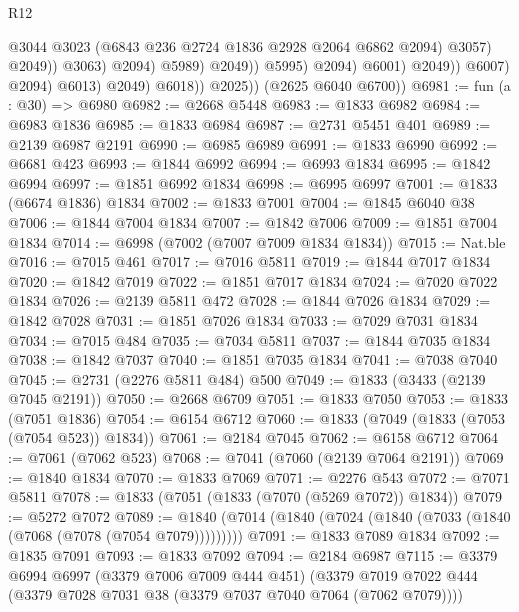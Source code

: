 \begin{lexlean}{R12}
\begin{coremodule}
                                                @3044
                                                @3023
                                                (@6843 @236 @2724 @1836 @2928 @2064 @6862 @2094)
                                                @3057)
                                              @2049))
                                          @3063)
                                        @2094)
                                      @5989)
                                    @2049))
                                @5995)
                              @2094)
                            @6001)
                          @2049))
                      @6007)
                    @2094)
                  @6013)
                @2049)
              @6018))
          @2025))
      (@2625 @6040 @6700))
@6981 := fun (a : @30) => @6980
@6982 := @2668 @5448
@6983 := @1833 @6982
@6984 := @6983 @1836
@6985 := @1833 @6984
@6987 := @2731 @5451 @401
@6989 := @2139 @6987 @2191
@6990 := @6985 @6989
@6991 := @1833 @6990
@6992 := @6681 @423
@6993 := @1844 @6992
@6994 := @6993 @1834
@6995 := @1842 @6994
@6997 := @1851 @6992 @1834
@6998 := @6995 @6997
@7001 := @1833 (@6674 @1836) @1834
@7002 := @1833 @7001
@7004 := @1845 @6040 @38
@7006 := @1844 @7004 @1834
@7007 := @1842 @7006
@7009 := @1851 @7004 @1834
@7014 := @6998 (@7002 (@7007 @7009 @1834 @1834))
@7015 := Nat.ble
@7016 := @7015 @461
@7017 := @7016 @5811
@7019 := @1844 @7017 @1834
@7020 := @1842 @7019
@7022 := @1851 @7017 @1834
@7024 := @7020 @7022 @1834
@7026 := @2139 @5811 @472
@7028 := @1844 @7026 @1834
@7029 := @1842 @7028
@7031 := @1851 @7026 @1834
@7033 := @7029 @7031 @1834
@7034 := @7015 @484
@7035 := @7034 @5811
@7037 := @1844 @7035 @1834
@7038 := @1842 @7037
@7040 := @1851 @7035 @1834
@7041 := @7038 @7040
@7045 := @2731 (@2276 @5811 @484) @500
@7049 := @1833 (@3433 (@2139 @7045 @2191))
@7050 := @2668 @6709
@7051 := @1833 @7050
@7053 := @1833 (@7051 @1836)
@7054 := @6154 @6712
@7060 := @1833 (@7049 (@1833 (@7053 (@7054 @523)) @1834))
@7061 := @2184 @7045
@7062 := @6158 @6712
@7064 := @7061 (@7062 @523)
@7068 := @7041 (@7060 (@2139 @7064 @2191))
@7069 := @1840 @1834
@7070 := @1833 @7069
@7071 := @2276 @543
@7072 := @7071 @5811
@7078 := @1833 (@7051 (@1833 (@7070 (@5269 @7072)) @1834))
@7079 := @5272 @7072
@7089 := @1840 (@7014 (@1840 (@7024 (@1840 (@7033 (@1840 (@7068 (@7078 (@7054 @7079)))))))))
@7091 := @1833 @7089 @1834
@7092 := @1835 @7091
@7093 := @1833 @7092
@7094 := @2184 @6987
@7115 := @3379
    @6994
    @6997
    (@3379 @7006 @7009 @444 @451)
    (@3379 @7019 @7022 @444 (@3379 @7028 @7031 @38 (@3379 @7037 @7040 @7064 (@7062 @7079))))

\end{coremodule}
\end{lexlean}

